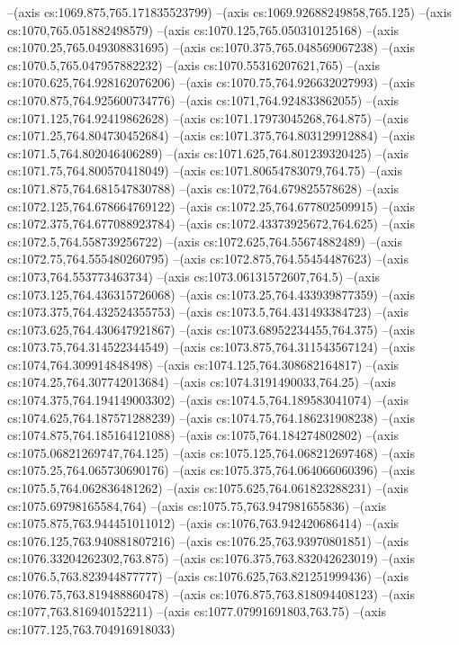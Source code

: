 --(axis cs:1069.875,765.171835523799)
--(axis cs:1069.92688249858,765.125)
--(axis cs:1070,765.051882498579)
--(axis cs:1070.125,765.050310125168)
--(axis cs:1070.25,765.049308831695)
--(axis cs:1070.375,765.048569067238)
--(axis cs:1070.5,765.047957882232)
--(axis cs:1070.55316207621,765)
--(axis cs:1070.625,764.928162076206)
--(axis cs:1070.75,764.926632027993)
--(axis cs:1070.875,764.925600734776)
--(axis cs:1071,764.924833862055)
--(axis cs:1071.125,764.92419862628)
--(axis cs:1071.17973045268,764.875)
--(axis cs:1071.25,764.804730452684)
--(axis cs:1071.375,764.803129912884)
--(axis cs:1071.5,764.802046406289)
--(axis cs:1071.625,764.801239320425)
--(axis cs:1071.75,764.800570418049)
--(axis cs:1071.80654783079,764.75)
--(axis cs:1071.875,764.681547830788)
--(axis cs:1072,764.679825578628)
--(axis cs:1072.125,764.678664769122)
--(axis cs:1072.25,764.677802509915)
--(axis cs:1072.375,764.677088923784)
--(axis cs:1072.43373925672,764.625)
--(axis cs:1072.5,764.558739256722)
--(axis cs:1072.625,764.55674882489)
--(axis cs:1072.75,764.555480260795)
--(axis cs:1072.875,764.55454487623)
--(axis cs:1073,764.553773463734)
--(axis cs:1073.06131572607,764.5)
--(axis cs:1073.125,764.436315726068)
--(axis cs:1073.25,764.433939877359)
--(axis cs:1073.375,764.432524355753)
--(axis cs:1073.5,764.431493384723)
--(axis cs:1073.625,764.430647921867)
--(axis cs:1073.68952234455,764.375)
--(axis cs:1073.75,764.314522344549)
--(axis cs:1073.875,764.311543567124)
--(axis cs:1074,764.309914848498)
--(axis cs:1074.125,764.308682164817)
--(axis cs:1074.25,764.307742013684)
--(axis cs:1074.3191490033,764.25)
--(axis cs:1074.375,764.194149003302)
--(axis cs:1074.5,764.189583041074)
--(axis cs:1074.625,764.187571288239)
--(axis cs:1074.75,764.186231908238)
--(axis cs:1074.875,764.185164121088)
--(axis cs:1075,764.184274802802)
--(axis cs:1075.06821269747,764.125)
--(axis cs:1075.125,764.068212697468)
--(axis cs:1075.25,764.065730690176)
--(axis cs:1075.375,764.064066060396)
--(axis cs:1075.5,764.062836481262)
--(axis cs:1075.625,764.061823288231)
--(axis cs:1075.69798165584,764)
--(axis cs:1075.75,763.947981655836)
--(axis cs:1075.875,763.944451011012)
--(axis cs:1076,763.942420686414)
--(axis cs:1076.125,763.940881807216)
--(axis cs:1076.25,763.93970801851)
--(axis cs:1076.33204262302,763.875)
--(axis cs:1076.375,763.832042623019)
--(axis cs:1076.5,763.823944877777)
--(axis cs:1076.625,763.821251999436)
--(axis cs:1076.75,763.819488860478)
--(axis cs:1076.875,763.818094408123)
--(axis cs:1077,763.816940152211)
--(axis cs:1077.07991691803,763.75)
--(axis cs:1077.125,763.704916918033)
